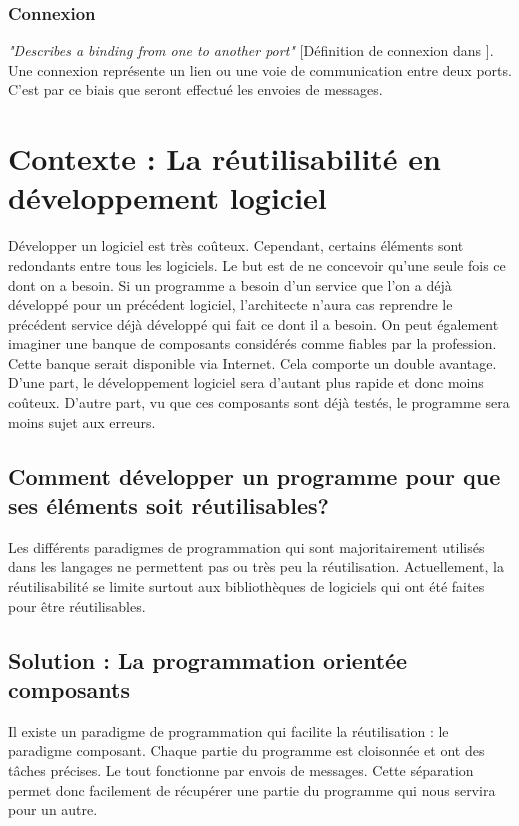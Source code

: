 \documentclass[11pt,a4paper,openany,oneside]{book}
\begin{document}
\subsubsection{Connexion}

\textit{"Describes a binding from one to another port"} [Définition de connexion dans \citep{these}].\\
Une connexion représente un lien ou une voie de communication entre deux ports. C'est par ce biais que seront effectué les envoies de messages.

\section{Contexte : La réutilisabilité en développement logiciel}

Développer un logiciel est très coûteux. Cependant, certains éléments sont redondants entre tous les logiciels. Le but est de ne concevoir qu'une seule fois ce dont on a besoin. Si un programme a besoin d'un service que l'on a déjà développé pour un précédent logiciel, l'architecte n'aura cas reprendre le précédent service déjà développé qui fait ce dont il a besoin. On peut également imaginer une banque de composants considérés comme fiables par la profession. Cette banque serait disponible via Internet. Cela comporte un double avantage. D'une part, le développement logiciel sera d'autant plus rapide et donc moins coûteux. D'autre part, vu que ces composants sont déjà testés, le programme sera moins sujet aux erreurs.

\subsection{Comment développer un programme pour que ses éléments soit réutilisables?}

Les différents paradigmes de programmation qui sont majoritairement utilisés dans les langages ne permettent pas ou très peu la réutilisation. Actuellement, la réutilisabilité se limite surtout aux bibliothèques de logiciels qui ont été faites pour être réutilisables.

\subsection{Solution : La programmation orientée composants}

Il existe un paradigme de programmation qui facilite la réutilisation : le paradigme composant. Chaque partie du programme est cloisonnée et ont des tâches précises. Le tout fonctionne par envois de messages. Cette séparation permet donc facilement de récupérer une partie du programme qui nous servira pour un autre.
\end{document}
